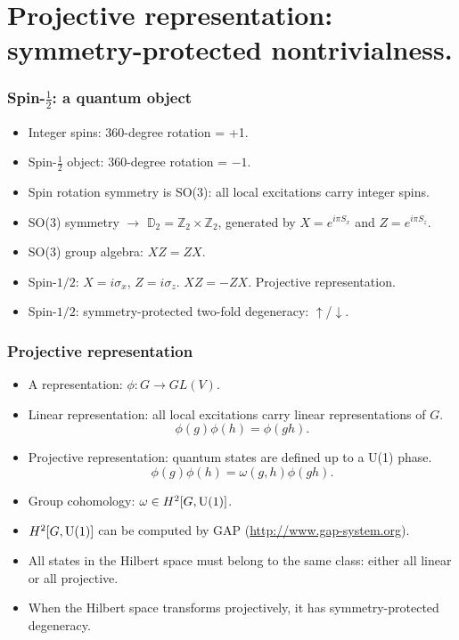 \documentclass[xcolor=table, 10pt, aspectratio=169]{beamer}
\begin{document}
\section{Projective representation: symmetry-protected nontrivialness.}

\begin{frame}
\frametitle{Spin-$\frac12$: a quantum object}
\begin{itemize}
  \item Integer spins: 360-degree rotation = +1.
  \item Spin-$\frac12$ object: 360-degree rotation = $-1$.
  \item Spin rotation symmetry is SO(3): all local excitations carry integer spins.
\item SO(3) symmetry $\rightarrow$ $\mathbb D_2=\mathbb Z_2\times\mathbb Z_2$, generated by $X=e^{i\pi S_x}$ and $Z=e^{i\pi S_z}$.
\item SO(3) group algebra: $XZ = ZX$.
\item Spin-$1/2$: $X=i\sigma_x$, $Z=i\sigma_z$. $XZ=-ZX$. Projective representation.
\item Spin-$1/2$: symmetry-protected two-fold degeneracy: $\uparrow$/$\downarrow$.
\end{itemize}
\begin{center}
  \begin{animateinline}{25}
  \end{animateinline}
\end{center}
\end{frame}

\begin{frame}
\frametitle{Projective representation}
\begin{itemize}
  \item A representation: $\phi: G\rightarrow GL(V)$.
  \item Linear representation: all local excitations carry linear representations of $G$.
  \[\phi(g)\phi(h) = \phi(gh).\]
  \item Projective representation: quantum states are defined up to a U(1) phase.
  \[\phi(g)\phi(h)=\omega(g, h)\phi(gh).\]
  \item Group cohomology: $\omega\in H^2[G, \text U(1)]$.
  \item $H^2[G, \text U(1)]$ can be computed by GAP (\url{http://www.gap-system.org}).
  \item All states in the Hilbert space must belong to the same class: either all linear or all projective.
  \item When the Hilbert space transforms projectively, it has symmetry-protected degeneracy.
\end{itemize}
\end{frame}
\end{document}

